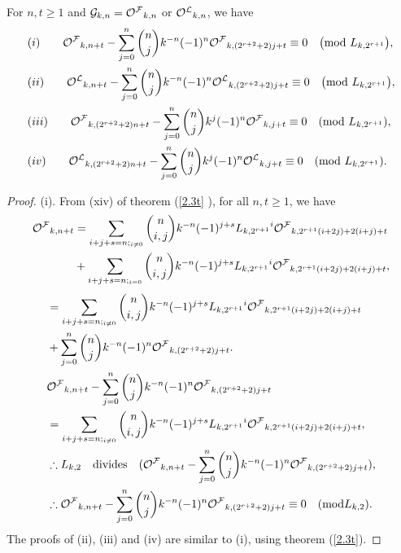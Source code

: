 \begin{theorem}For $n, t\geq 1$ and $\mathcal{G}_{k,n}={{\mathcal{O^F}}}_{k,n}$ or ${{\mathcal{O^L}}}_{k,n}$, we have\label{2.4t}
\begin{align*}
&(i)\qquad{{\mathcal{O^F}}}_{k,n+t}-\sum\limits_{j=0}^{n}\binom{n}{j} k^{-n}(-1)^{n}{{\mathcal{O^F}}}_{k,(2^{r+2}+2)j+t} \equiv 0\quad \big( \text{mod } { L_{k,2^{r+1}}}\big),\\
&(ii)\qquad{{\mathcal{O^L}}}_{k,n+t}-\sum\limits_{j=0}^{n}\binom{n}{j} k^{-n}(-1)^{n}{{\mathcal{O^L}}}_{k,(2^{r+2}+2)j+t} \equiv 0\quad \big(\text{mod } { L_{k,2^{r+1}}}\big),\\
&(iii)\qquad{{\mathcal{O^F}}}_{k,(2^{r+2}+2)n+t}-\sum\limits_{j=0}^{n}\binom{n}{j} k^{j}(-1)^{n}{{\mathcal{O^F}}}_{k,j+t}\equiv 0\quad (\text{mod } L_{k,2^{r+1}}),\\
&(iv)\qquad{{\mathcal{O^L}}}_{k,(2^{r+2}+2)n+t}-\sum\limits_{j=0}^{n}\binom{n}{j} k^{j}(-1)^{n}{{\mathcal{O^L}}}_{k,j+t}\equiv 0\quad (\text{mod } L_{k,2^{r+1}}).
\end{align*}
\end{theorem}
\begin{proof}
(i). From (xiv) of theorem (\ref{2.3t} ), for all $n, t\geq 1$, we have\\
\begin{align*}
{{\mathcal{O^F}}}_{k,n+t}&=\sum\limits_{{i+j+s=n};_{i\neq 0}}\binom{n}{i, j} k^{-n}(-1)^{j+s}{{L}_{k,2^{r+1}}}^i{{\mathcal{O^F}}}_{k,2^{r+1}(i+2j)+2(i+j)+t}\\&+\sum\limits_{{i+j+s=n};_{i= 0}}\binom{n}{i, j} k^{-n}(-1)^{j+s}{{L}_{k,2^{r+1}}}^i{{\mathcal{O^F}}}_{k,2^{r+1}(i+2j)+2(i+j)+t},\\
\end{align*}
\begin{align*}
&=\sum\limits_{{i+j+s=n};_{i\neq 0}}\binom{n}{i, j}  k^{-n}(-1)^{j+s}{{L}_{k,2^{r+1}}}^i{{\mathcal{O^F}}}_{k,2^{r+1}(i+2j)+2(i+j)+t}\\&+\sum\limits_{j=0}^{n}\binom{n}{j} k^{-n}(-1)^{n}{{\mathcal{O^F}}}_{k,(2^{r+2}+2)j+t}.\\
&{{\mathcal{O^F}}}_{k,n+t}-\sum\limits_{j=0}^{n}\binom{n}{j} k^{-n}(-1)^{n}{{\mathcal{O^F}}}_{k,(2^{r+2}+2)j+t}\\&=\sum\limits_{{i+j+s=n};_{i\neq 0}}\binom{n}{i, j} k^{-n}(-1)^{j+s}{{L}_{k,2^{r+1}}}^i{{\mathcal{O^F}}}_{k,2^{r+1}(i+2j)+2(i+j)+t},\\
&\therefore {L}_{k,2} \quad\text{divides}\quad({{\mathcal{O^F}}}_{k,n+t}-\sum\limits_{j=0}^{n}\binom{n}{j} k^{-n}(-1)^{n}{{\mathcal{O^F}}}_{k,(2^{r+2}+2)j+t}),\\
&\therefore{{\mathcal{O^F}}}_{k,n+t}-\sum\limits_{j=0}^{n}\binom{n}{j}  k^{-n}(-1)^{n}{{\mathcal{O^F}}}_{k,(2^{r+2}+2)j+t}\equiv 0\quad (\text{mod} {L}_{k,2}).
\end{align*}
\noindent The proofs of (ii), (iii) and (iv) are similar to (i), using theorem (\ref{2.3t}).
\end{proof} 
